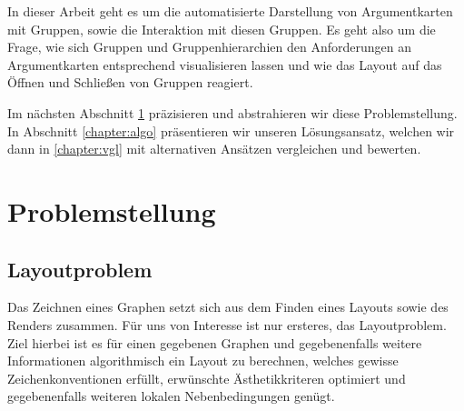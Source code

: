 In dieser Arbeit geht es um die automatisierte Darstellung von Argumentkarten mit Gruppen, sowie die Interaktion mit diesen Gruppen. 
Es geht also um die Frage, wie sich Gruppen und Gruppenhierarchien den Anforderungen an Argumentkarten entsprechend visualisieren lassen 
und wie das Layout auf das Öffnen und Schließen von Gruppen reagiert.

Im nächsten Abschnitt \ref{chapter:layoutproblem}  präzisieren und abstrahieren wir diese Problemstellung. 
In Abschnitt \ref{chapter:algo} präsentieren wir unseren Lösungsansatz, welchen wir dann in \ref{chapter:vgl} mit alternativen Ansätzen vergleichen und bewerten.



\chapter{Problemstellung}%
\label{chapter:layoutproblem}

\section{Layoutproblem}
Das Zeichnen eines Graphen setzt sich aus dem Finden eines Layouts sowie des Renders zusammen. 
Für uns von Interesse ist nur ersteres, das Layoutproblem. 
Ziel hierbei ist es für einen gegebenen Graphen und gegebenenfalls weitere Informationen algorithmisch ein Layout zu berechnen,
welches gewisse Zeichenkonventionen erfüllt, erwünschte Ästhetikkriteren optimiert und gegebenenfalls weiteren lokalen Nebenbedingungen genügt.


